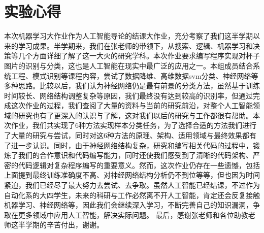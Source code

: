 \section{实验心得}
本次机器学习大作业作为人工智能导论的结课大作业，充分考察了我们这半学期以来的学习成果。半学期来，我们在张老师的带领下，从搜索、逻辑、机器学习和决策等几个方面详细了解了这一大火的研究学科。本次作业要求编写程序实现对杯子图片的识别与分类，这也是人工智能在现实中最广泛的应用之一。本组成员结合系统工程、模式识别等课程内容，尝试了数据降维、高维数据svm分类、神经网络等多种思路。比较以后，我们认为神经网络仍是最有前景的分类方法，虽然基于训练时间较长、网络结构调整复杂等原因，我们最终没有达到较高的识别率，但通过完成这次作业的过程，我们查阅了大量的资料与当前的研究前沿，对整个人工智能领域的研究也有了更深入的认识与了解，这对我们以后的研究与工作都很有帮助。本次作业，我们共实现了6种方法实现样本分类任务，为了选择合适的方法我们进行了大量的研究与尝试，同时对这6种方法的原理、架构、适用领域与最终效果都有了进一步认识。同时，由于神经网络结构复杂，研究和编写相关代码的过程中，锻炼了我们的合作意识和代码编写能力，同时还使我们感受到了清晰的代码架构、严密的代码逻辑对复杂程序编写的重要意义。然而，这次作业仍存在一些遗憾，包括上面提到最终训练准确度不高、对神经网络结构分析仍不到位等等，但也因为时间紧迫，我们已经尽了最大努力去尝试、去争取。虽然人工智能已经结课，不过作为自动化系的大四学生，未来的科研与工作必然离不开人工智能，肯定还会反复接触机器学习、神经网络等，因此我们会继续深入学习，不断完善自己的知识漏洞，争取在更多领域中应用人工智能，解决实际问题。
最后，感谢张老师和各位助教老师这半学期的辛苦付出，谢谢。


